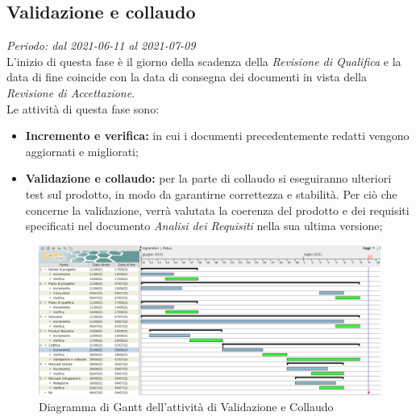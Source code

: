     \subsection{Validazione e collaudo}
        \textit{Periodo: dal 2021-06-11 al 2021-07-09}\\
        L’inizio di questa fase è il giorno della scadenza della \textit{Revisione di Qualifica} e la data di fine coincide con la data di consegna dei documenti in vista della \textit{Revisione di Accettazione}.\\
        Le attività di questa fase sono:
        \begin {itemize}
            \item \textbf{Incremento e verifica:} in cui i documenti precedentemente redatti vengono aggiornati e migliorati;
            \item \textbf{Validazione e collaudo:} per la parte di collaudo si eseguiranno ulteriori test sul prodotto, in modo da garantirne correttezza e stabilità. Per ciò che concerne la validazione, verrà valutata la coerenza del prodotto e dei requisiti specificati nel documento \textit{Analisi dei Requisiti} nella sua ultima versione;
        \end {itemize}
        \begin{figure}[!ht]
            \caption{Diagramma di Gantt dell’attività di Validazione e Collaudo}
            \vspace{5px}
            \includegraphics[scale=0.3]{../../../Images/Diagrammi/Gantt/validazione.png}
            \centering
        \end{figure}
